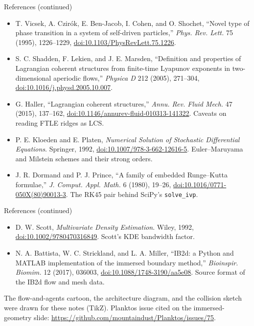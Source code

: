\documentclass[aspectratio=169,11pt]{beamer}
\newcommand{\code}[1]{\texttt{#1}}
\begin{document}
\begin{frame}{References (continued)}
\footnotesize
\begin{itemize}\itemsep3pt
  \item T. Vicsek, A. Czir\'ok, E. Ben-Jacob, I. Cohen, and O. Shochet, ``Novel type of phase transition in a system of self-driven particles,'' \emph{Phys. Rev. Lett.} 75 (1995), 1226--1229, \href{https://doi.org/10.1103/PhysRevLett.75.1226}{doi:10.1103/PhysRevLett.75.1226}.
  \item S. C. Shadden, F. Lekien, and J. E. Marsden, ``Definition and properties of Lagrangian coherent structures from finite-time Lyapunov exponents in two-dimensional aperiodic flows,'' \emph{Physica D} 212 (2005), 271--304, \href{https://doi.org/10.1016/j.physd.2005.10.007}{doi:10.1016/j.physd.2005.10.007}.
  \item G. Haller, ``Lagrangian coherent structures,'' \emph{Annu. Rev. Fluid Mech.} 47 (2015), 137--162, \href{https://doi.org/10.1146/annurev-fluid-010313-141322}{doi:10.1146/annurev-fluid-010313-141322}. Caveats on reading FTLE ridges as LCS.
  \item P. E. Kloeden and E. Platen, \emph{Numerical Solution of Stochastic Differential Equations}. Springer, 1992, \href{https://doi.org/10.1007/978-3-662-12616-5}{doi:10.1007/978-3-662-12616-5}. Euler--Maruyama and Milstein schemes and their strong orders.
  \item J. R. Dormand and P. J. Prince, ``A family of embedded Runge--Kutta formulae,'' \emph{J. Comput. Appl. Math.} 6 (1980), 19--26, \href{https://doi.org/10.1016/0771-050X(80)90013-3}{doi:10.1016/0771-050X(80)90013-3}. The RK45 pair behind SciPy's \code{solve\_ivp}.
\end{itemize}
\end{frame}

\begin{frame}{References (continued)}
\footnotesize
\begin{itemize}\itemsep3pt
  \item D. W. Scott, \emph{Multivariate Density Estimation}. Wiley, 1992, \href{https://doi.org/10.1002/9780470316849}{doi:10.1002/9780470316849}. Scott's KDE bandwidth factor.
  \item N. A. Battista, W. C. Strickland, and L. A. Miller, ``IB2d: a Python and MATLAB implementation of the immersed boundary method,'' \emph{Bioinspir. Biomim.} 12 (2017), 036003, \href{https://doi.org/10.1088/1748-3190/aa5e08}{doi:10.1088/1748-3190/aa5e08}. Source format of the IB2d flow and mesh data.
\end{itemize}
\begin{punchbox}
\footnotesize The flow-and-agents cartoon, the architecture diagram, and the collision sketch were drawn for these notes (TikZ). Planktos issue cited on the immersed-geometry slide: \url{https://github.com/mountaindust/Planktos/issues/75}.
\end{punchbox}
\end{frame}
\end{document}
